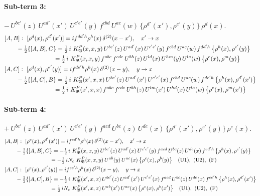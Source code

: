 \documentclass[10pt]{article}
\numberwithin{equation}{section}
\begin{document}
\paragraph{Sub-term 3:} $-\,U^{bc'}(z)\,U^{ad'}(x')\,U^{c'e'}(y)\,f^{cbd}\,U^{ac}(w)\,\big\{\rho^{d'}(x'),\rho^{e'}(y)\big\}\,\rho^{d}(x)$.
\begin{align}
&[A,B]:\ [\rho^{d}(x),\rho^{d'}(x')]=i f^{dd'h}\rho^{h}(x)\,\delta^{(2)}(x-x'),\quad x'\to x\notag\\
&\qquad -\tfrac12\{[A,B],C\}=\tfrac12\,i\,\,K^{P}_{\mathfrak B}(x,x,y)\,U^{bc'}(z)\,U^{ad'}(x)\,U^{c'e'}(y)\,f^{cbd}\,U^{ac}(w)\,f^{dd'h}\,\big\{\rho^{h}(x),\rho^{e'}(y)\big\}\notag\\
&\qquad\phantom{-\tfrac12\{[A,B],C\}}=\tfrac12\,i\,\,K^{P}_{\mathfrak B}(x,x,y)\,f^{abc}\,f^{cde}\,U^{bh}(z)\,U^{ld}(x)\,U^{hm}(y)\,U^{la}(w)\,\big\{\rho^{e}(x),\rho^{m}(y)\big\}
\label{B:eq:GII.I1.P-3-AB}\\
&[A,C]:\ [\rho^{d}(x),\rho^{e'}(y)]=i f^{de'h}\rho^{h}(x)\,\delta^{(2)}(x-y),\quad y\to x\notag\\
&\qquad -\tfrac12\{[A,C],B\}=\tfrac12\,i\,\,K^{P}_{\mathfrak B}(x',x,x)\,U^{bc'}(z)\,U^{ad'}(x')\,U^{c'e'}(x)\,f^{cbd}\,U^{ac}(w)\,f^{de'h}\,\big\{\rho^{h}(x),\rho^{d'}(x')\big\}\notag\\
&\qquad\phantom{-\tfrac12\{[A,C],B\}}=\tfrac12\,i\,\,K^{P}_{\mathfrak B}(x',x,x)\,f^{abc}\,f^{cde}\,U^{bh}(z)\,U^{lm}(x')\,U^{hd}(x)\,U^{la}(w)\,\big\{\rho^{e}(x),\rho^{m}(x')\big\}
\label{B:eq:GII.I1.P-3-AC}
\end{align}
\paragraph{Sub-term 4:} $+\,U^{bc'}(z)\,U^{ad'}(x')\,U^{c'e'}(y)\,f^{acd}\,U^{bc}(z)\,U^{de}(x)\,\big\{\rho^{d'}(x'),\rho^{e'}(y)\big\}\,\rho^{e}(x)$.
\begin{align}
&[A,B]:\ [\rho^{e}(x),\rho^{d'}(x')]=i f^{ed'h}\rho^{h}(x)\,\delta^{(2)}(x-x'),\quad x'\to x\notag\\
&\qquad -\tfrac12\{[A,B],C\}=-\tfrac12\,i\,\,K^{P}_{\mathfrak B}(x,x,y)\,U^{bc'}(z)\,U^{ad'}(x)\,U^{c'e'}(y)\,f^{acd}\,U^{bc}(z)\,U^{de}(x)\,f^{ed'h}\,\big\{\rho^{h}(x),\rho^{e'}(y)\big\}\notag\\
&\qquad\phantom{-\tfrac12\{[A,B],C\}}=-\tfrac12\,i N_{c}\,\,K^{P}_{\mathfrak B}(x,x,y)\,U^{ab}(y)\,U^{ac}(x)\,\big\{\rho^{c}(x),\rho^{b}(y)\big\}\quad\text{(U1)},\ \text{(U2)},\ \text{(F)}
\label{B:eq:GII.I1.P-4-AB}\\
&[A,C]:\ [\rho^{e}(x),\rho^{e'}(y)]=i f^{ee'h}\rho^{h}(x)\,\delta^{(2)}(x-y),\quad y\to x\notag\\
&\qquad -\tfrac12\{[A,C],B\}=-\tfrac12\,i\,\,K^{P}_{\mathfrak B}(x',x,x)\,U^{bc'}(z)\,U^{ad'}(x')\,U^{c'e'}(x)\,f^{acd}\,U^{bc}(z)\,U^{de}(x)\,f^{ee'h}\,\big\{\rho^{h}(x),\rho^{d'}(x')\big\}\notag\\
&\qquad\phantom{-\tfrac12\{[A,C],B\}}=\tfrac12\,i N_{c}\,\,K^{P}_{\mathfrak B}(x',x,x)\,U^{ab}(x')\,U^{ac}(x)\,\big\{\rho^{c}(x),\rho^{b}(x')\big\}\quad\text{(U1)},\ \text{(U2)},\ \text{(F)}
\label{B:eq:GII.I1.P-4-AC}
\end{align}
\end{document}
